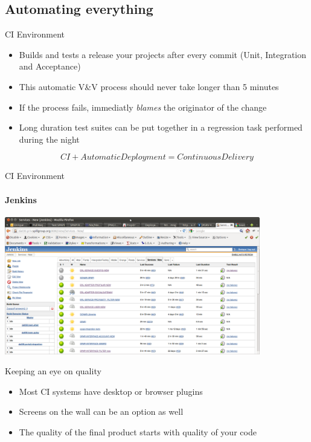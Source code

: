 \documentclass[aspectratio=169]{beamer}
\begin{document}
\subsection*{Automating everything}
\label{automating_everything}

\begin{frame}{CI Environment}
    \begin{itemize}
    \pause
    \item Builds and tests a release your projects after every commit (Unit, Integration and Acceptance)
    \pause
    \item This automatic V\&V process should never take longer than 5 minutes
    \pause
    \item If the process fails, immediatly \emph{blames} the originator of the change
    \pause
    \item Long duration test suites can be put together in a regression task performed during the night
    \end{itemize}
    \pause
    \begin{equation*}
    \boxed{CI + AutomaticDeployment = ContinuousDelivery}
    \end{equation*}
\end{frame}
\begin{frame}{CI Environment}
    \framesubtitle{Jenkins}
    \includegraphics[height=6.0cm]{images/jenkins.png}
\end{frame}

\begin{frame}{Keeping an eye on quality}
    \begin{itemize}
    \item Most CI systems have desktop or browser plugins
    \item Screens on the wall can be an option as well
    \item The quality of the final product starts with quality of your code
    \end{itemize}
\end{frame}
\end{document}
